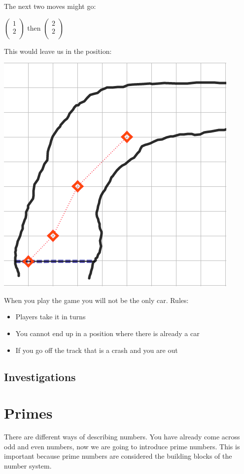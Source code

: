 The next two moves might go:

$\left(
\begin{array}{c}
1\\
2\\
\end{array}
\right)$
then
$\left(
\begin{array}{c}
2\\
2\\
\end{array}
\right)$

This would leave us in the position:

\bigskip
\begin{center}
  \includegraphics[scale=0.6]{./Images/Sequences/VMR_3.png}
\end{center}

When you play the game you will not be the only car.
Rules:
\begin{itemize}
  \item Players take it in turns
  \item You cannot end up in a position where there is already a car
  \item If you go off the track that is a crash and you are out
\end{itemize}
\subsection{Investigations}
\section{Primes}
There are different ways of describing numbers.  You have already come across odd and even numbers, now we are going to introduce prime numbers.  This is important because prime numbers are considered the building blocks of the number system.

